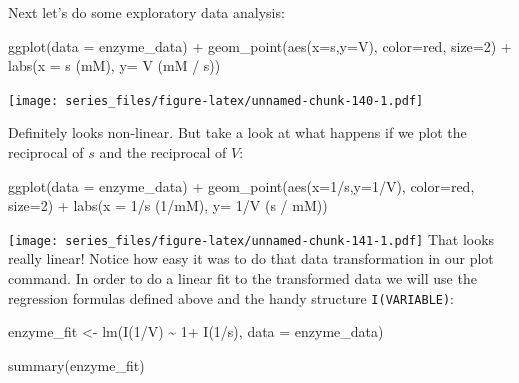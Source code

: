 \documentclass[
]{book}
\newenvironment{Shaded}{\begin{snugshade}}{\end{snugshade}}
\newcommand{\AttributeTok}[1]{\textcolor[rgb]{0.77,0.63,0.00}{#1}}
\newcommand{\DecValTok}[1]{\textcolor[rgb]{0.00,0.00,0.81}{#1}}
\newcommand{\FunctionTok}[1]{\textcolor[rgb]{0.00,0.00,0.00}{#1}}
\newcommand{\NormalTok}[1]{#1}
\newcommand{\OtherTok}[1]{\textcolor[rgb]{0.56,0.35,0.01}{#1}}
\newcommand{\SpecialCharTok}[1]{\textcolor[rgb]{0.00,0.00,0.00}{#1}}
\newcommand{\StringTok}[1]{\textcolor[rgb]{0.31,0.60,0.02}{#1}}
\theoremstyle{definition}
\theoremstyle{definition}
\theoremstyle{definition}
\theoremstyle{remark}
\begin{document}
Next let's do some exploratory data analysis:

\begin{Shaded}
\begin{Highlighting}[]
\FunctionTok{ggplot}\NormalTok{(}\AttributeTok{data =}\NormalTok{ enzyme\_data) }\SpecialCharTok{+}
  \FunctionTok{geom\_point}\NormalTok{(}\FunctionTok{aes}\NormalTok{(}\AttributeTok{x=}\NormalTok{s,}\AttributeTok{y=}\NormalTok{V),}
             \AttributeTok{color=}\StringTok{\textquotesingle{}red\textquotesingle{}}\NormalTok{,}
             \AttributeTok{size=}\DecValTok{2}\NormalTok{) }\SpecialCharTok{+}
  \FunctionTok{labs}\NormalTok{(}\AttributeTok{x =} \StringTok{\textquotesingle{}s (mM)\textquotesingle{}}\NormalTok{,}
       \AttributeTok{y=} \StringTok{\textquotesingle{}V (mM / s)\textquotesingle{}}\NormalTok{)}
\end{Highlighting}
\end{Shaded}

\texttt{[image: series\_files/figure-latex/unnamed-chunk-140-1.pdf]}

Definitely looks non-linear. But take a look at what happens if we plot the reciprocal of \(s\) and the reciprocal of \(V\):

\begin{Shaded}
\begin{Highlighting}[]
\FunctionTok{ggplot}\NormalTok{(}\AttributeTok{data =}\NormalTok{ enzyme\_data) }\SpecialCharTok{+}
  \FunctionTok{geom\_point}\NormalTok{(}\FunctionTok{aes}\NormalTok{(}\AttributeTok{x=}\DecValTok{1}\SpecialCharTok{/}\NormalTok{s,}\AttributeTok{y=}\DecValTok{1}\SpecialCharTok{/}\NormalTok{V),}
             \AttributeTok{color=}\StringTok{\textquotesingle{}red\textquotesingle{}}\NormalTok{,}
             \AttributeTok{size=}\DecValTok{2}\NormalTok{) }\SpecialCharTok{+}
  \FunctionTok{labs}\NormalTok{(}\AttributeTok{x =} \StringTok{\textquotesingle{}1/s (1/mM)\textquotesingle{}}\NormalTok{,}
       \AttributeTok{y=} \StringTok{\textquotesingle{}1/V (s / mM)\textquotesingle{}}\NormalTok{)}
\end{Highlighting}
\end{Shaded}

\texttt{[image: series\_files/figure-latex/unnamed-chunk-141-1.pdf]}
That looks really linear! Notice how easy it was to do that data transformation in our plot command. In order to do a linear fit to the transformed data we will use the regression formulas defined above and the handy structure \texttt{I(VARIABLE)}:

\begin{Shaded}
\begin{Highlighting}[]
\NormalTok{enzyme\_fit }\OtherTok{\textless{}{-}} \FunctionTok{lm}\NormalTok{(}\FunctionTok{I}\NormalTok{(}\DecValTok{1}\SpecialCharTok{/}\NormalTok{V) }\SpecialCharTok{\textasciitilde{}} \DecValTok{1}\SpecialCharTok{+} \FunctionTok{I}\NormalTok{(}\DecValTok{1}\SpecialCharTok{/}\NormalTok{s), }
              \AttributeTok{data =}\NormalTok{ enzyme\_data)}


\FunctionTok{summary}\NormalTok{(enzyme\_fit)}
\end{Highlighting}
\end{Shaded}
\end{document}
